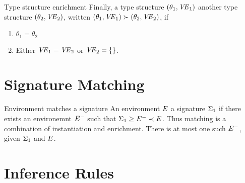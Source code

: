 \begin{definition}{Type structure enrichment}
Finally, a type structure $(\theta_{1},\textit{V\kern-.05emE\/}_{1})$
 another type structure $(\theta_{2},\textit{V\kern-.05emE\/}_{2})$,
written $(\theta_{1},\textit{V\kern-.05emE\/}_{1})\succ(\theta_{2},\textit{V\kern-.05emE\/}_{2})$,
if
\begin{enumerate}
\item $\theta_1=\theta_2$
\item Either $\textit{V\kern-.05emE\/}_{1}=\textit{V\kern-.05emE\/}_{2}$ or $\textit{V\kern-.05emE\/}_{2}=\{\}$.
\end{enumerate}
\end{definition}

\section{Signature Matching}

\begin{definition}{Environment matches a signature}
An environment $E$  a signature $\Sigma_{1}$ if there
exists an environemnt $E^{-}$ such that $\Sigma_{1}\geq E^{-}\prec E$.
Thus matching is a combination of instantiation and enrichment. There is
at most one such $E^{-}$, given $\Sigma_{1}$ and $E$.
\end{definition}

\section{Inference Rules}